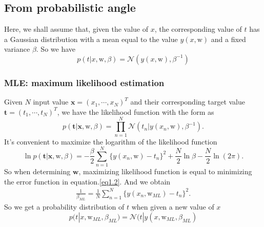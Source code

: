 \documentclass{article}
\newcommand{\norm}{\mathcal N}
\newcommand{\mbf}{\mathbf}
\newcommand{\mrm}{\mathrm}
\begin{document}
\subsection*{From probabilistic angle}
Here, we shall assume that, given the value of $x$, the corresponding value of $t$ has a Gaussian distribution with a mean equal to the value $y(x,\mrm{w})$ and a fixed variance $\beta$. So we have 
\begin{equation}
    p(t|x, \mrm w, \beta) = \norm(y(x, \mrm w), \beta^{-1}) \tag{1.4}
\end{equation}

\subsubsection*{MLE: maximum likelihood estimation}
Given $N$ input value $\mbf{x} = (x_1,\cdots, x_N)^T$ and their corresponding target value $\mbf t= (t_1, \cdots, t_N)^T$, we have the likelihood function with the form as 
\begin{equation}
    p(\mbf t|\mbf x, \mrm w, \beta) = \prod_{n=1}^N\norm(t_n|y(x_n,\mrm w),\beta^{-1}). \tag{1.5}
\end{equation}
It's convenient to maximize the logarithm of the likelihood function
\begin{equation}
    \ln p(\mbf t|\mbf x, \mrm w, \beta) = -\frac{\beta}{2}\sum_{n=1}^N\{y(x_n,\mrm w)-t_n\}^2+\frac N2\ln\beta-\frac N2\ln(2\pi). \tag{1.6}
\end{equation}
So when determining $\mbf w$, maximizing likelihood function is equal to minimizing the error function in equation.\ref{eq1.2}. And we obtain
\begin{gather}
    \frac1{\beta_{ML}} = \frac1N\sum_{n=1}^N\{y(x_n,\mrm w_{ML})-t_n\}^2. \tag{1.7}
\end{gather}
So we get a probability distribution of $t$ when given a new value of $x$
\begin{equation}
    p(t|x,\mrm w_{ML},\beta_{ML}) = \norm(t|y(x,\mrm w_{ML},\beta_{ML}) \tag{1.8}
\end{equation}
\end{document}
